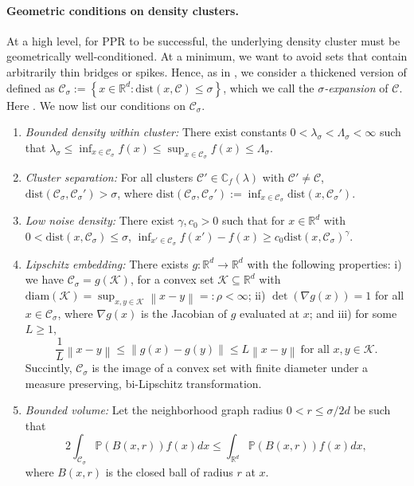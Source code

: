 \documentclass{article}
\newcommand{\diam}{\rho}
\newcommand{\set}[1]{\left\{#1\right\}}
\newcommand{\Reals}{\mathbb{R}}
\newcommand{\Rd}{\Reals^d}
\newcommand{\norm}[1]{\left\lVert#1\right\rVert}
\newcommand{\1}{\mathbf{1}}
\newcommand{\dist}{\mathrm{dist}}
\newcommand{\Pbb}{\mathbb{P}}
\newcommand{\Cbb}{\mathbb{C}}
\newcommand{\Cset}{\mathcal{C}}
\newcommand{\Csig}{\Cset_{\sigma}}
\theoremstyle{aldenthm}
\theoremstyle{aldenrmrk}
\begin{document}
\paragraph{Geometric conditions on density clusters.} At a high level, for PPR
to be successful, the underlying density cluster must be geometrically
well-conditioned.  At a minimum, we want to avoid sets that contain arbitrarily
thin bridges or spikes.  Hence, as in \citet{chaudhuri2010}, we consider a
thickened version of \smash{$\Cset \in \Cbb_f(\lambda)$} defined as 
$\Csig := \set{x \in \Reals^d: \dist(x,\Cset) \leq \sigma}$, which 
we call the \emph{$\sigma$-expansion} of $\Cset$. Here 
\smash{$\dist(x,\Cset) := \inf_{y \in \Cset} \norm{y - x}$}.  We now list our
conditions on $\Csig$.

\begin{enumerate}[label=(A\arabic*)]
\item
  \label{asmp: bounded_density}
  \emph{Bounded density within cluster:} There exist constants
  $0<\lambda_{\sigma}< \Lambda_{\sigma}<\infty$ such that 
  $\lambda_{\sigma} \leq \inf_{x \in \Csig} f(x) \leq \sup_{x \in \Csig} f(x)
  \leq \Lambda_{\sigma}$. 
  
\item
  \label{asmp: cluster_separation}
  \emph{Cluster separation:}
  For all clusters $\Cset' \in \Cbb_f(\lambda)$ with $\Cset' \not= \Cset$, 
  $\dist(\Csig,\Csig') > \sigma$, where $\dist(\Csig,\Csig') := \inf_{x
    \in \Csig} \dist(x,\Csig')$.  
    
\item 
  \label{asmp: low_noise_density}
  \emph{Low noise density:} There exist $\gamma,c_0 > 0$ such that for 
  $x \in \Rd$ with $0 < \dist(x, \Csig) \leq \sigma$,   
  $\inf_{x' \in \Csig} f(x') - f(x) \geq  c_0 \dist(x, \Csig)^{\gamma}$.
	
\item
  \label{asmp: embedding}
  \emph{Lipschitz embedding:}
  There exists $g: \Reals^d \to \Reals^d$ with the following properties: i)
  we have $\Csig = g(\mathcal{K})$, for a convex set $\mathcal{K} \subseteq \Rd$
  with $\mathrm{diam}(\mathcal{K}) = \sup_{x,y \in \mathcal{K}}\norm{x - y} =:
  \diam < \infty$; ii) $\det(\nabla g (x)) = 1$ for all $x \in \Csig$, where
  $\nabla g(x)$ is the Jacobian of $g$ evaluated at $x$; and iii) for some $L
  \geq 1$,   
  \begin{equation*}
    \frac{1}{L}\norm{x - y} \leq \norm{g(x) - g(y)} \leq L \norm{x - y} ~
    \text{for all $x,y \in \mathcal{K}$}. 
  \end{equation*}
  Succintly, $\Csig$ is the image of a convex set with finite diameter 
  under a  measure preserving, bi-Lipschitz transformation. 

\item
  \label{asmp: bounded_volume}
  \emph{Bounded volume:}
  Let the neighborhood graph radius $0 < r \leq \sigma/2d$ be such that
  \begin{equation*}
    2 \int_{\Csig} \Pbb(B(x,r)) f(x) dx \leq \int_{\Rd} \Pbb(B(x,r)) f(x) dx,
  \end{equation*}
  where $B(x,r)$ is the closed ball of radius $r$ at $x$.
\end{enumerate}
\end{document}
